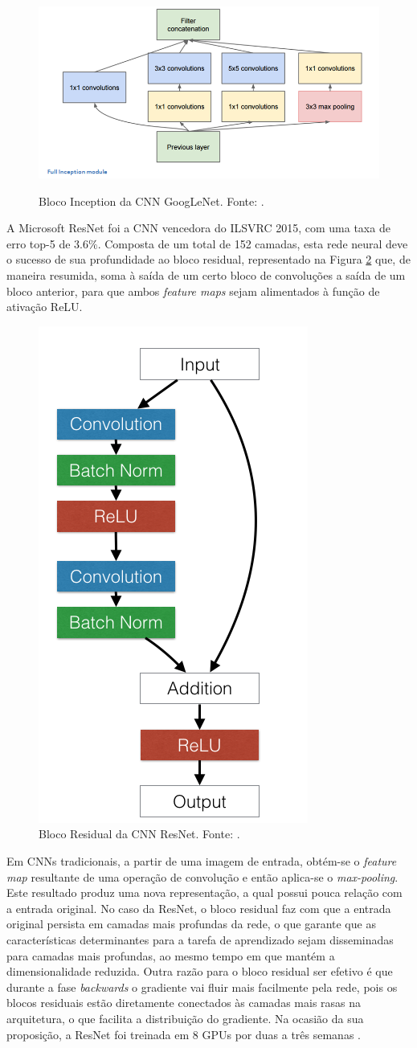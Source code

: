 \begin{figure}[h!]
	\centering
	\caption{Bloco Inception da CNN GoogLeNet. Fonte: \cite{9dlpapers}.}
	\includegraphics[width=0.7\linewidth]{img/GoogLeNet}
	\label{fig:bloco_inception}
\end{figure}



A Microsoft ResNet foi a CNN vencedora do ILSVRC 2015, com uma taxa de erro top-5 de $3.6\%$. Composta de um total de 152 camadas, esta rede neural deve o sucesso de sua profundidade ao bloco residual, representado na Figura \ref{fig:bloco_residual} que, de maneira resumida, soma à saída de um certo bloco de convoluções a saída de um bloco anterior, para que ambos \emph{feature maps} sejam alimentados à função de ativação ReLU.

\begin{figure}[h!]
\centering
\caption{Bloco Residual da CNN ResNet. Fonte: \cite{torch:resnet}.}\label{fig:bloco_residual}
\includegraphics[height=0.3\textwidth]{img/resnets_modelvariants}
\end{figure}

Em CNNs tradicionais, a partir de uma imagem de entrada, obtém-se o  \emph{feature map}  resultante de uma operação de convolução e então aplica-se o \emph{max-pooling}. Este resultado produz uma nova representação, a qual possui pouca relação com a entrada original. No caso da ResNet, o bloco residual faz com que a entrada original persista em camadas mais profundas da rede, o que garante que as características determinantes para a tarefa de aprendizado sejam disseminadas para camadas mais profundas, ao mesmo tempo em que mantém a dimensionalidade reduzida. Outra razão para o bloco residual ser efetivo é que durante a fase \emph{backwards} o gradiente vai fluir mais facilmente pela rede, pois os blocos residuais estão diretamente conectados às camadas mais rasas na arquitetura, o que facilita a distribuição do gradiente. Na ocasião da sua proposição, a ResNet foi treinada em 8 GPUs por duas a três semanas \cite{resnet}.

